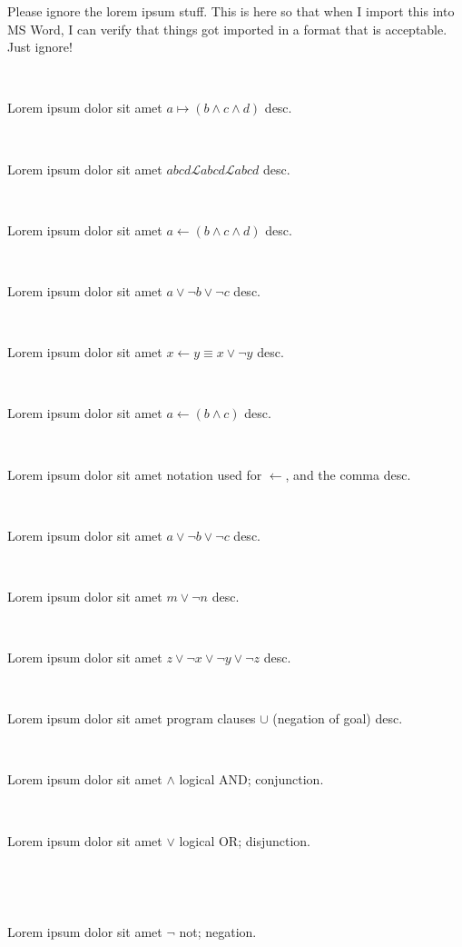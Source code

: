 \documentclass[12pt]{article}
\begin{document}
Please ignore the lorem ipsum stuff. This is here so that when I import this into MS Word, I can verify that things got imported in a format that is acceptable.  Just ignore!


\centerline{~}

Lorem ipsum dolor sit amet $ a \mapsto ( b \wedge c \wedge d )  $ desc.

\centerline{~}

Lorem ipsum dolor sit amet $ abcd \mathscr{L} abcd \mathcal{L}  abcd $ desc.

\centerline{~}

Lorem ipsum dolor sit amet $ a \leftarrow ( b \wedge c \wedge d )  $ desc.

\centerline{~}

Lorem ipsum dolor sit amet $ a \vee \neg b \vee \neg c $ desc.

\centerline{~}

Lorem ipsum dolor sit amet $ x \leftarrow y \equiv x \vee \neg y $ desc.

\centerline{~}

Lorem ipsum dolor sit amet $ a \leftarrow ( b \wedge c ) $ desc.

\centerline{~}

Lorem ipsum dolor sit amet notation used for $ \leftarrow $, and the comma  desc.

\centerline{~}

Lorem ipsum dolor sit amet $ a \vee \neg b \vee \neg c $ desc.

\centerline{~}

Lorem ipsum dolor sit amet $ m \vee \neg n $ desc.

\centerline{~}

Lorem ipsum dolor sit amet $ z \vee \neg x \vee \neg y \vee \neg z $ desc.

\centerline{~}

Lorem ipsum dolor sit amet program clauses $ \cup $ (negation of goal) desc.


\centerline{~}

Lorem ipsum dolor sit amet $ \wedge $ logical AND; conjunction.

\centerline{~}

Lorem ipsum dolor sit amet $ \vee $ logical OR; disjunction.

\centerline{~}

\centerline{~}

Lorem ipsum dolor sit amet $ \neg $ not; negation.

\centerline{~}
\end{document}
